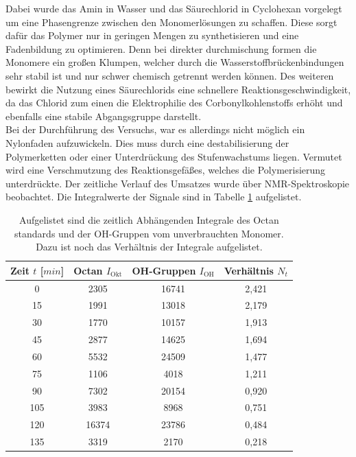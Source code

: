 \documentclass[10pt,a4paper,ngerman]{scrartcl}
\begin{document}
		Dabei wurde das Amin in Wasser und das Säurechlorid in Cyclohexan vorgelegt um eine Phasengrenze zwischen den Monomerlösungen zu schaffen. Diese sorgt dafür 
		das Polymer nur in geringen Mengen zu synthetisieren und eine Fadenbildung zu optimieren. Denn bei direkter durchmischung formen die Monomere ein großen 
		Klumpen, welcher durch die Wasserstoffbrückenbindungen sehr stabil ist und nur schwer chemisch getrennt werden können. Des weiteren bewirkt die Nutzung eines 
		Säurechlorids eine schnellere Reaktionsgeschwindigkeit, da das Chlorid zum einen die Elektrophilie des Corbonylkohlenstoffs erhöht und ebenfalls eine stabile 
		Abgangsgruppe darstellt.\\
		Bei der Durchführung des Versuchs, war es allerdings nicht möglich ein Nylonfaden aufzuwickeln. Dies muss durch eine destabilisierung der Polymerketten oder einer 
		Unterdrückung des Stufenwachstums liegen. Vermutet wird eine Verschmutzung des Reaktionsgefäßes, welches die Polymerisierung unterdrückte.
		\newpage
		Der zeitliche Verlauf des Umsatzes wurde über NMR-Spektroskopie beobachtet. Die Integralwerte der Signale sind in Tabelle \ref{integraleOctOH} aufgelistet.

		\begin{table}[H]
    	\begin{center}
        	\caption{Aufgelistet sind die zeitlich Abhängenden Integrale des Octan standards und der OH-Gruppen vom unverbrauchten Monomer. Dazu ist noch das Verhältnis der Integrale aufgelistet.}
        	\label{integraleOctOH}
            	\begin{tabular}{c|c|c|c}
					\hline
					Zeit $t$ [$min$]& Octan $I_\text{Okt}$ & OH-Gruppen $I_\text{OH}$ & Verhältnis $N_t$\\
					\hline  
					0	&2305	&16741	&2,421 \\
					15	&1991	&13018	&2,179 \\
					30	&1770	&10157	&1,913\\
					45	&2877	&14625	&1,694\\
					60	&5532	&24509	&1,477\\
					75	&1106	&4018	&1,211\\
					90	&7302	&20154	&0,920\\
					105	&3983	&8968	&0,751\\
					120	&16374	&23786	&0,484\\
					135	&3319	&2170	&0,218\\
				\end{tabular}
		\end{center}
		\end{table}
\end{document}
